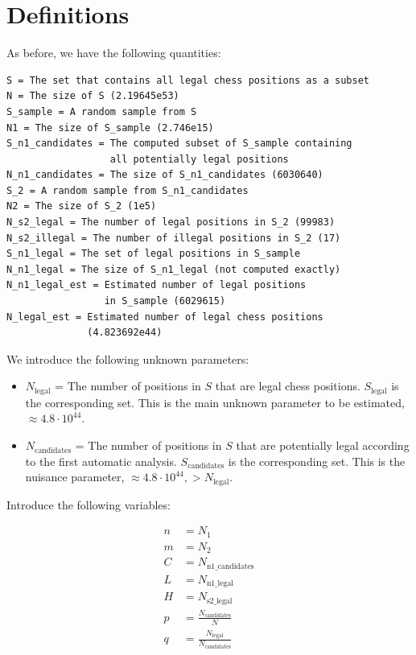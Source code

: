 \documentclass[a4paper,10pt]{article}
\begin{document}
\section*{Definitions}

As before, we have the following quantities:

\begin{verbatim}
S = The set that contains all legal chess positions as a subset
N = The size of S (2.19645e53)
S_sample = A random sample from S
N1 = The size of S_sample (2.746e15)
S_n1_candidates = The computed subset of S_sample containing
                  all potentially legal positions
N_n1_candidates = The size of S_n1_candidates (6030640)
S_2 = A random sample from S_n1_candidates
N2 = The size of S_2 (1e5)
N_s2_legal = The number of legal positions in S_2 (99983)
N_s2_illegal = The number of illegal positions in S_2 (17)
S_n1_legal = The set of legal positions in S_sample
N_n1_legal = The size of S_n1_legal (not computed exactly)
N_n1_legal_est = Estimated number of legal positions
                 in S_sample (6029615)
N_legal_est = Estimated number of legal chess positions
              (4.823692e44)
\end{verbatim}

We introduce the following unknown parameters:

\begin{itemize}

  \item $N_{\text{legal}}$ = The number of positions in $S$ that are legal chess
    positions. $S_{\text{legal}}$ is the corresponding set. This is the main
    unknown parameter to be estimated, $\approx 4.8 \cdot 10^{44}$.

  \item $N_{\text{candidates}}$ = The number of positions in $S$ that are
    potentially legal according to the first automatic analysis.
    $S_{\text{candidates}}$ is the corresponding set. This is the nuisance
    parameter, $\approx 4.8 \cdot 10^{44}, > N_{\text{legal}}$.

\end{itemize}

Introduce the following variables:

\begin{align}
n &= N_1                                                          \\
m &= N_2                                                          \\
C &= N_{\text{n1\_candidates}}                                    \\
L &= N_{\text{n1\_legal}}                                         \\
H &= N_{\text{s2\_legal}}                                         \\
p &= \frac{N_{\text{candidates}}}{N}                              \\
q &= \frac{N_{\text{legal}}}{N_{\text{candidates}}}
\end{align}
\end{document}
